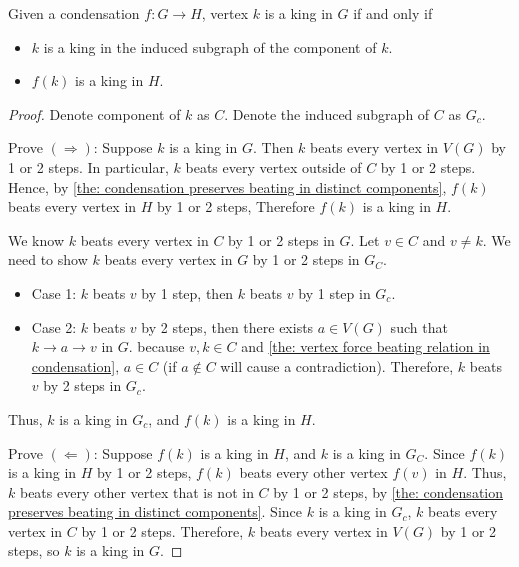 \begin{corollary}\label{the: condensation preserves king}
  Given a condensation \(f: G \to H\),
  vertex \(k\) is a king in \(G\) if and only if
  \begin{itemize}
    \item \(k\) is a king in the
      induced subgraph of the component of \(k\).
    \item \(f(k)\) is a king in \(H\).
  \end{itemize}
\end{corollary}

\begin{proof}
  Denote component of \(k\) as \(C\).
  Denote the induced subgraph of \(C\) as \(G_c\).

  Prove \((\Rightarrow )\):
  Suppose \(k\) is a king in \(G\).
  Then \(k\) beats every vertex in \(V(G)\) by 1 or 2 steps.
  In particular, \(k\) beats every vertex outside of \(C\) by
  1 or 2 steps.
  Hence, by \cref{the: condensation preserves beating in distinct components},
  \(f(k)\) beats every vertex in \(H\) by 1 or 2 steps,
  Therefore \(f(k)\) is a king in \(H\).

  We know \(k\) beats every vertex in \(C\) by 1 or 2 steps in \(G\).
  Let \(v \in C\) and \(v \neq k\).
  We need to show \(k\) beats every vertex in \(G\) by 1 or 2 steps in \(G_C\).
  \begin{itemize}
    \item Case 1: \(k\) beats \(v\) by 1 step, then
      \(k\) beats \(v\) by 1 step in \(G_c\).
    \item Case 2: \(k\) beats \(v\) by 2 steps, then
      there exists \(a \in V(G)\) such that \(k \to a \to v\) in \(G\).
      because \(v, k \in C\) and
      \cref{the: vertex force beating relation in condensation},
      \(a \in C\) (if \(a \notin C\) will cause a contradiction).
      Therefore, \(k\) beats \(v\) by 2 steps in \(G_c\).
  \end{itemize}
  Thus, \(k\) is a king in \(G_c\),
  and \(f(k)\) is a king in \(H\).

  Prove \((\Leftarrow )\):
  Suppose \(f(k)\) is a king in \(H\),
  and \(k\) is a king in \(G_C\).
  Since \(f(k)\) is a king in \(H\) by 1 or 2 steps,
  \(f(k)\) beats every other vertex \(f(v)\) in \(H\).
  Thus, \(k\) beats every other vertex that is not in \(C\)
  by 1 or 2 steps, by \cref{the: condensation preserves beating in distinct components}.
  Since \(k\) is a king in \(G_c\),
  \(k\) beats every vertex in \(C\) by 1 or 2 steps.
  Therefore, \(k\) beats every vertex in \(V(G)\) by 1 or 2 steps,
  so \(k\) is a king in \(G\).
\end{proof}


